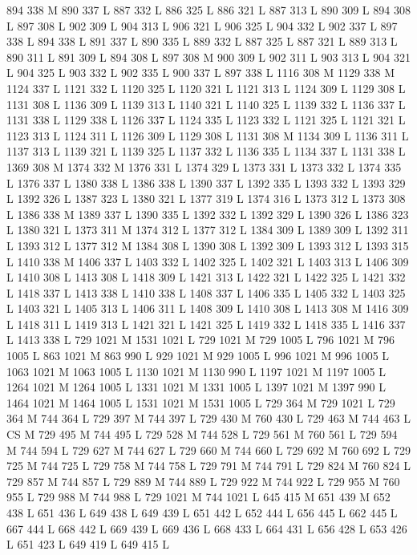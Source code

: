 {{{{{{{{{{{{{{{{{{{{{{{{894 338 M 890 337 L
887 332 L
886 325 L
886 321 L
887 313 L
890 309 L
894 308 L
897 308 L
902 309 L
904 313 L
906 321 L
906 325 L
904 332 L
902 337 L
897 338 L
894 338 L
891 337 L
890 335 L
889 332 L
887 325 L
887 321 L
889 313 L
890 311 L
891 309 L
894 308 L
897 308 M 900 309 L
902 311 L
903 313 L
904 321 L
904 325 L
903 332 L
902 335 L
900 337 L
897 338 L
1116 308 M 1129 338 M 1124 337 L
1121 332 L
1120 325 L
1120 321 L
1121 313 L
1124 309 L
1129 308 L
1131 308 L
1136 309 L
1139 313 L
1140 321 L
1140 325 L
1139 332 L
1136 337 L
1131 338 L
1129 338 L
1126 337 L
1124 335 L
1123 332 L
1121 325 L
1121 321 L
1123 313 L
1124 311 L
1126 309 L
1129 308 L
1131 308 M 1134 309 L
1136 311 L
1137 313 L
1139 321 L
1139 325 L
1137 332 L
1136 335 L
1134 337 L
1131 338 L
1369 308 M 1374 332 M 1376 331 L
1374 329 L
1373 331 L
1373 332 L
1374 335 L
1376 337 L
1380 338 L
1386 338 L
1390 337 L
1392 335 L
1393 332 L
1393 329 L
1392 326 L
1387 323 L
1380 321 L
1377 319 L
1374 316 L
1373 312 L
1373 308 L
1386 338 M 1389 337 L
1390 335 L
1392 332 L
1392 329 L
1390 326 L
1386 323 L
1380 321 L
1373 311 M 1374 312 L
1377 312 L
1384 309 L
1389 309 L
1392 311 L
1393 312 L
1377 312 M 1384 308 L
1390 308 L
1392 309 L
1393 312 L
1393 315 L
1410 338 M 1406 337 L
1403 332 L
1402 325 L
1402 321 L
1403 313 L
1406 309 L
1410 308 L
1413 308 L
1418 309 L
1421 313 L
1422 321 L
1422 325 L
1421 332 L
1418 337 L
1413 338 L
1410 338 L
1408 337 L
1406 335 L
1405 332 L
1403 325 L
1403 321 L
1405 313 L
1406 311 L
1408 309 L
1410 308 L
1413 308 M 1416 309 L
1418 311 L
1419 313 L
1421 321 L
1421 325 L
1419 332 L
1418 335 L
1416 337 L
1413 338 L
729 1021 M 1531 1021 L
729 1021 M 729 1005 L
796 1021 M 796 1005 L
863 1021 M 863 990 L
929 1021 M 929 1005 L
996 1021 M 996 1005 L
1063 1021 M 1063 1005 L
1130 1021 M 1130 990 L
1197 1021 M 1197 1005 L
1264 1021 M 1264 1005 L
1331 1021 M 1331 1005 L
1397 1021 M 1397 990 L
1464 1021 M 1464 1005 L
1531 1021 M 1531 1005 L
729 364 M 729 1021 L
729 364 M 744 364 L
729 397 M 744 397 L
729 430 M 760 430 L
729 463 M 744 463 L
CS M
729 495 M 744 495 L
729 528 M 744 528 L
729 561 M 760 561 L
729 594 M 744 594 L
729 627 M 744 627 L
729 660 M 744 660 L
729 692 M 760 692 L
729 725 M 744 725 L
729 758 M 744 758 L
729 791 M 744 791 L
729 824 M 760 824 L
729 857 M 744 857 L
729 889 M 744 889 L
729 922 M 744 922 L
729 955 M 760 955 L
729 988 M 744 988 L
729 1021 M 744 1021 L
645 415 M 651 439 M 652 438 L
651 436 L
649 438 L
649 439 L
651 442 L
652 444 L
656 445 L
662 445 L
667 444 L
668 442 L
669 439 L
669 436 L
668 433 L
664 431 L
656 428 L
653 426 L
651 423 L
649 419 L
649 415 L
}}}}}}}}}}}}}}}}}}}}}}}}
